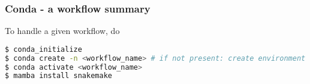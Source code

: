 \begin{frame}
  \frametitle{Conda - a workflow summary}
  To handle a given workflow, do
  \begin{lstlisting}[language=Bash, style=Shell]
$ conda_initialize
$ conda create -n <workflow_name> # if not present: create environment
$ conda activate <workflow_name>
$ mamba install snakemake
  \end{lstlisting}
\end{frame}

